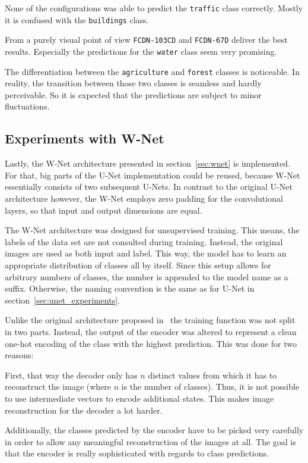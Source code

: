 None of the configurations was able to predict the \texttt{traffic} class correctly. Mostly it is confused with the \texttt{buildings} class.

From a purely visual point of view \texttt{FCDN-103CD} and \texttt{FCDN-67D} deliver the best results. Especially the predictions for the \texttt{water} class seem very promising.

The differentiation between the \texttt{agriculture} and \texttt{forest} classes is noticeable. In reality, the transition between those two classes is seamless and hardly perceivable. So it is expected that the predictions are subject to minor fluctuations.

\subsection{Experiments with W-Net}
Lastly, the W-Net architecture presented in section~\ref{sec:wnet} is implemented. For that, big parts of the U-Net implementation could be reused, because W-Net essentially consists of two subsequent U-Nets. In contrast to the original U-Net architecture however, the W-Net employs zero padding for the convolutional layers, so that input and output dimensions are equal.

The W-Net architecture was designed for unsupervised training. This means, the labels of the data set are not consulted during training. Instead, the original images are used as both input and label. This way, the model has to learn an appropriate distribution of classes all by itself. Since this setup allows for arbitrary numbers of classes, the number is appended to the model name as a suffix. Otherwise, the naming convention is the same as for U-Net in section~\ref{sec:unet_experiments}.

Unlike the original architecture proposed in~\cite{wnet17} the training function was not split in two parts. Instead, the output of the encoder was altered to represent a clean one-hot encoding of the class with the highest prediction. This was done for two reasons:

First, that way the decoder only has $n$ distinct values from which it has to reconstruct the image (where $n$ is the number of classes). Thus, it is not possible to use intermediate vectors to encode additional states. This makes image reconstruction for the decoder a lot harder.

Additionally, the classes predicted by the encoder have to be picked very carefully in order to allow any meaningful reconstruction of the images at all. The goal is that the encoder is really sophisticated with regards to class predictions.

